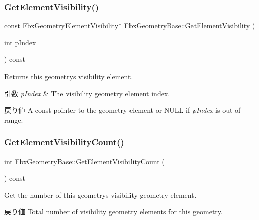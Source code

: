 \subsubsection{\texorpdfstring{Get\+Element\+Visibility()}{GetElementVisibility()}\hspace{0.1cm}{\footnotesize\ttfamily [2/2]}}
{\footnotesize\ttfamily const \hyperlink{fbxlayer_8h_a98f6c16a3021e9e04b0352f652eac2a1}{Fbx\+Geometry\+Element\+Visibility}$\ast$ Fbx\+Geometry\+Base\+::\+Get\+Element\+Visibility (\begin{DoxyParamCaption}\item[{int}]{p\+Index = {} }\end{DoxyParamCaption}) const}

Returns this geometry\textquotesingle{}s visibility element. 
\begin{DoxyParams}{引数}
{\em p\+Index} & The visibility geometry element index. \\
\hline
\end{DoxyParams}
\begin{DoxyReturn}{戻り値}
A const pointer to the geometry element or {\ttfamily N\+U\+LL} if {\itshape p\+Index} is out of range. 
\end{DoxyReturn}
\mbox{\label{class_fbx_geometry_base_a9f41f006fb1545c11e1a06c80312cda9}} 
\subsubsection{\texorpdfstring{Get\+Element\+Visibility\+Count()}{GetElementVisibilityCount()}}
{\footnotesize\ttfamily int Fbx\+Geometry\+Base\+::\+Get\+Element\+Visibility\+Count (\begin{DoxyParamCaption}{ }\end{DoxyParamCaption}) const}

Get the number of this geometry\textquotesingle{}s visibility geometry element. \begin{DoxyReturn}{戻り値}
Total number of visibility geometry elements for this geometry. 
\end{DoxyReturn}
\mbox{\label{class_fbx_geometry_base_ad30d8655b9606f653e9467bb07c8b1f3}} 
